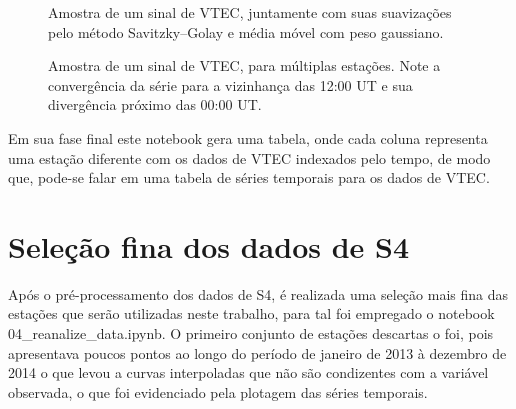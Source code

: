 \begin{figure}[H]
\centering
{}
\caption{Amostra de um sinal de VTEC, juntamente com suas suavizações pelo método Savitzky–Golay e média móvel com peso gaussiano.}
\label{fig:vtecsj2}

\caption{Amostra de um sinal de VTEC, para múltiplas estações. Note a convergência da série para a vizinhança das 12:00 UT e sua divergência próximo das 00:00 UT.}
\label{fig:vtecsignal}
\end{figure}

Em sua fase final este notebook gera uma tabela, onde cada coluna representa uma estação diferente com os dados de VTEC indexados pelo tempo, de modo que, pode-se falar em uma tabela de séries temporais para os dados de VTEC.

\section{Seleção fina dos dados de S4}

Após o pré-processamento dos dados de S4, é realizada uma seleção mais fina das estações que serão utilizadas neste trabalho, para tal foi empregado o notebook 04\_reanalize\_data.ipynb. O primeiro conjunto de estações descartas o foi, pois apresentava poucos pontos ao longo do período de janeiro de 2013 à dezembro de 2014 o que levou a curvas interpoladas que não são condizentes com a variável observada, o que foi evidenciado pela plotagem das séries temporais. 

